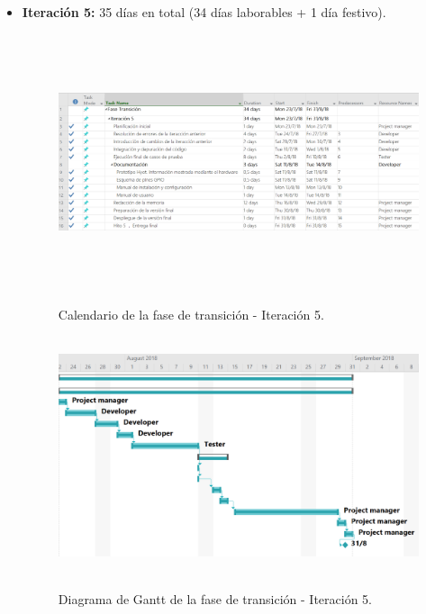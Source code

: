 \documentclass[12pt,a4paper, twoside]{report}
\begin{document}
\begin{itemize}
		\newpage
		\item \textbf{Iteración 5:} 35 días en total (34 días laborables + 1 día festivo).
		
		\begin{figure}[!ht]   
			\caption{Calendario de la fase de transición - Iteración 5.} 
			\begin{center} 
		 		\includegraphics[width=16cm,height=7.5cm]{Images/planning/iterations/It5_calendar} \\
				\label{fig:planning-it5-calendar} 
			\end{center}  
		\end{figure}  
		
		\begin{figure}[!ht]   
			\caption{Diagrama de Gantt de la fase de transición - Iteración 5.} 
			\begin{center} 
		 		\includegraphics[width=17 cm,height=7cm]{Images/planning/iterations/It5_gantt} \\
				\label{fig:planning-it5-gantt} 
			\end{center}  
		\end{figure}  
		
	\end{itemize}
	
\end{document}
